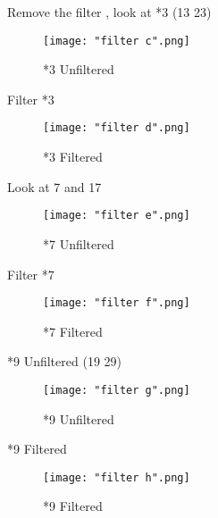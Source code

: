 \par 
Remove the filter , look at *3 (13 23)

\begin{figure}[h]
    \centering
    \texttt{[image: "filter c".png]}
    \caption{*3 Unfiltered}
\end{figure}
\pagebreak

\par 
Filter *3
\begin{figure}[h]
    \centering
    \texttt{[image: "filter d".png]}
    \caption{*3 Filtered}
\end{figure}
\pagebreak

\par 
Look at 7 and 17
\begin{figure}[h]
    \centering
    \texttt{[image: "filter e".png]}
    \caption{*7 Unfiltered}
\end{figure}
\pagebreak

\par 
Filter *7
\begin{figure}[h]
    \centering
    \texttt{[image: "filter f".png]}
    \caption{*7 Filtered}
\end{figure}
\pagebreak

\par
*9 Unfiltered (19 29)
\begin{figure}[h]
    \centering
    \texttt{[image: "filter g".png]}
    \caption{*9 Unfiltered}
\end{figure}
\pagebreak

\par 
*9 Filtered
\begin{figure}[h]
    \centering
    \texttt{[image: "filter h".png]}
    \caption{*9 Filtered}
\end{figure}
\pagebreak

